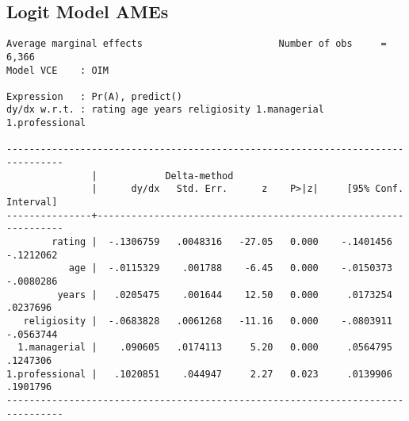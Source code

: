 \documentclass{article}
\begin{document}
\hypertarget{logitame}{\subsection*{Logit Model AMEs}}
\begin{verbatim}
Average marginal effects                        Number of obs     =      6,366
Model VCE    : OIM

Expression   : Pr(A), predict()
dy/dx w.r.t. : rating age years religiosity 1.managerial 1.professional

--------------------------------------------------------------------------------
               |            Delta-method
               |      dy/dx   Std. Err.      z    P>|z|     [95% Conf. Interval]
---------------+----------------------------------------------------------------
        rating |  -.1306759   .0048316   -27.05   0.000    -.1401456   -.1212062
           age |  -.0115329    .001788    -6.45   0.000    -.0150373   -.0080286
         years |   .0205475    .001644    12.50   0.000     .0173254    .0237696
   religiosity |  -.0683828   .0061268   -11.16   0.000    -.0803911   -.0563744
  1.managerial |    .090605   .0174113     5.20   0.000     .0564795    .1247306
1.professional |   .1020851    .044947     2.27   0.023     .0139906    .1901796
--------------------------------------------------------------------------------
\end{verbatim}
\end{document}
